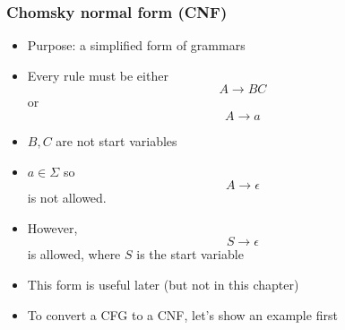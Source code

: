 




\begin{frame}[allowframebreaks] \frametitle{Chomsky normal form (CNF)}
  \begin{itemize}
\item Purpose: a simplified form of grammars
\item Every rule must be either
  \begin{equation*}
A \rightarrow BC
\end{equation*}
or
\begin{equation*}
A \rightarrow a
\end{equation*}
\item $B,C$ are not start variables
\item $a \in\Sigma $ so
  \begin{equation*}
    A \rightarrow \epsilon
  \end{equation*}
  is not allowed. 
\item However,
  \begin{equation*}
S \rightarrow \epsilon
\end{equation*}
is allowed, where $S$ is the start
variable
\item This form is useful later (but not in this chapter)
\item To convert a CFG to a CNF, let's show an example first
\end{itemize}\end{frame}


